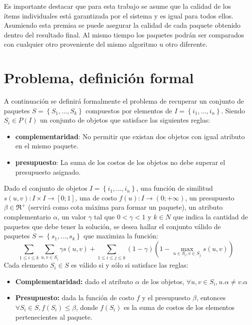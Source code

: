 Es importante destacar que para esta trabajo se asume que la calidad de los ítems individuales está garantizada por el sistema y es igual para todos ellos. Asumiendo esta premisa se puede asegurar la calidad de cada paquete obtenido dentro del resultado final. Al mismo tiempo los paquetes podrán ser comparados con cualquier otro proveniente del mismo algoritmo u otro diferente.

\section{Problema, definición formal}\label{introduccion:problemaFormal}
A continuación se definirá formalmente el problema de recuperar un conjunto de paquetes $S = \left\{S_1, \ldots, S_k\right\}$ compuestos por elementos de $I=\left\{i_1,\ldots, i_n\right\}$. Siendo $S_i \in P(I)$ un conjunto de objetos que satisface las siguientes reglas:
\begin{itemize}
\item \textbf{complementaridad}:  No permitir que existan dos objetos con igual atributo en el mismo paquete.
	\item \textbf{presupuesto}: La suma de los costos de los objetos no debe superar el presupuesto asignado.
\end{itemize}

Dado el conjunto de objetos $I=\left\{i_1,\ldots, i_n\right\}$, una función de similitud $s(u,v): I \times I \rightarrow [0;1]$, una de costo $f(u): I \rightarrow (0;+\infty)$, un presupuesto $\beta \in \Re^{+}$ (servirá como cota máxima para formar un paquete), un atributo complementario $\alpha$, un valor $\gamma$ tal que $0 < \gamma < 1$ y $k \in N$ que indica la cantidad de paquetes que debe tener la solución, se desea hallar el conjunto válido de paquetes $S = \left\{s_1, \ldots, s_k\right\}$ que maximiza la función:
\begin{equation} \label{des:eq-fnObj}
\sum_{1 \leq i \leq k}{\sum_{u,v \in S_i}{\gamma s(u,v)}} + \sum_{1 \leq i \leq j \leq k}{(1-\gamma) (1-\max_{u \in S_i, v \in S_j}{s(u,v)})}
\end{equation}
Cada elemento $S_i \in S$ es válido si y sólo si satisface las reglas:
\begin{itemize}
	\item \textbf{Complementaridad:} dado el atributo $\alpha$ de los objetos, $\forall u,v \in S_i, u.\alpha \neq v.\alpha$
	\item \textbf{Presupuesto:} dada la función de costo $f$ y el presupuesto $\beta$, entonces $\forall S_i \in S, f(S_i) \leq \beta$, donde $f(S_i)$ es la suma de costos de los elementos pertenecientes al paquete.
\end{itemize}		  

